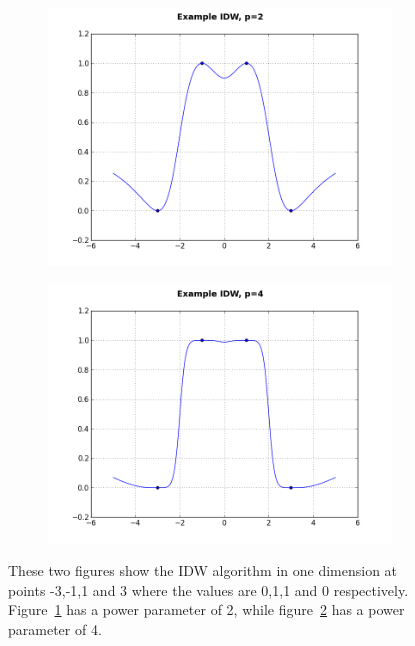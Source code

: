             \begin{figure}[H]
                \centering
                \begin{subfigure}{.5\textwidth}
                    \centering
                    \includegraphics[width=\linewidth]{./images/IDW1.png}
                    \caption{}
                    \label{fig:example_idw_p2}
                \end{subfigure}%
                \begin{subfigure}{.5\textwidth}
                    \includegraphics[width=\linewidth]{./images/IDW2.png}
                    \caption{}
                    \label{fig:example_idw_p4}
                \end{subfigure}
                \caption{These two figures show the IDW algorithm in one dimension at points -3,-1,1 and 3 where the values are 0,1,1 and 0 respectively. Figure~\ref{fig:example_idw_p2} has a power parameter of 2, while figure~\ref{fig:example_idw_p4} has a power parameter of 4.  }
                \label{fig:example_idw}
            \end{figure}

